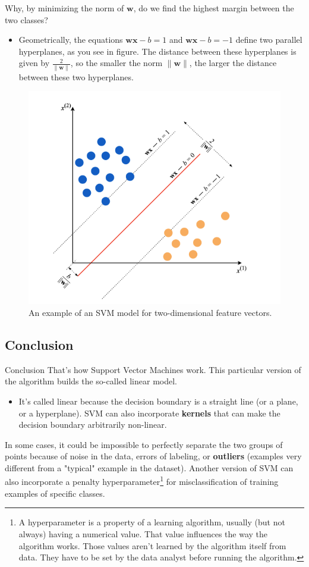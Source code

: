 \documentclass[10pt,dvipsnames]{beamer}
\begin{document}
\begin{frame}
    Why, by minimizing the norm of $\mathbf{w}$, do we find the highest margin between the two classes?
    \begin{itemize}
        \item Geometrically, the equations $\mathbf{w} \mathbf{x}-b=1$ and $\mathbf{w} \mathbf{x}-b=-1$ define two parallel hyperplanes, as you see in figure. The distance between these hyperplanes is given by $\frac{2}{\|\mathbf{w}\|}$, so the smaller the norm $\|\mathbf{w}\|$, the larger the distance between these two hyperplanes.
    \end{itemize}
    \begin{figure}[ht]
        \centering
        \includegraphics[width=0.5\linewidth]{imgs/intro_1.png}
        \caption{An example of an SVM model for two-dimensional feature vectors.}
    \end{figure}
\end{frame}

\subsection{Conclusion}
\begin{frame}{Conclusion}
    That's how Support Vector Machines work. This particular version of the algorithm builds the so-called linear model.
    \begin{itemize}
        \item It's called linear because the decision boundary is a straight line (or a plane, or a hyperplane). SVM can also incorporate \textbf{kernels} that can make the decision boundary arbitrarily non-linear.
    \end{itemize}
    In some cases, it could be impossible to perfectly separate the two groups of points because of noise in the data, errors of labeling, or \textbf{outliers} (examples very different from a "typical" example in the dataset). Another version of SVM can also incorporate a penalty hyperparameter\footnote{A hyperparameter is a property of a learning algorithm, usually (but not always) having a numerical value. That value inﬂuences the way the algorithm works. Those values aren’t learned by the algorithm itself from data. They have to be set by the data analyst before running the algorithm.} for misclassification of training examples of specific classes.
\end{frame}
\end{document}
